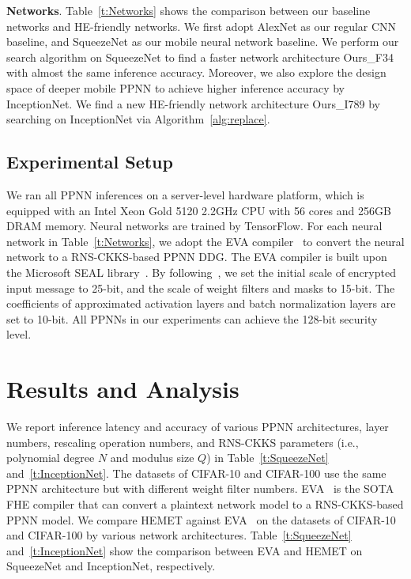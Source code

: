 \documentclass{article}
\begin{document}
\textbf{Networks}. Table~\ref{t:Networks} shows the comparison between our baseline networks and HE-friendly networks. We first adopt AlexNet as our regular CNN baseline, and SqueezeNet as our mobile neural network baseline. We perform our search algorithm on SqueezeNet to find a faster network architecture Ours\_F34 with almost the same inference accuracy. Moreover, we also explore the design space of deeper mobile PPNN to achieve higher inference accuracy by InceptionNet. We find a new HE-friendly network architecture Ours\_I789 by searching on InceptionNet via Algorithm~\ref{alg:replace}.  

	


	
\subsection{Experimental Setup}

We ran all PPNN inferences on a server-level hardware platform, which is equipped with an Intel Xeon Gold 5120 2.2GHz CPU with 56 cores and 256GB DRAM memory. Neural networks are trained by TensorFlow. For each neural network in Table~\ref{t:Networks}, we adopt the EVA compiler~\cite{Dathathri:PLDI20:EVA} to convert the neural network to a RNS-CKKS-based PPNN DDG. The EVA compiler is built upon the Microsoft SEAL library~\cite{sealcrypto}. By following~\cite{Dathathri:PLDI20:EVA}, we set the initial scale of encrypted input message to 25-bit, and the scale of weight filters and masks to 15-bit. The coefficients of approximated activation layers and batch normalization layers are set to 10-bit. All PPNNs in our experiments can achieve the 128-bit security level.
	
	




\section{Results and Analysis}

We report inference latency and accuracy of various PPNN architectures, layer numbers, rescaling operation numbers, and RNS-CKKS parameters (i.e., polynomial degree $N$ and modulus size $Q$) in Table~\ref{t:SqueezeNet} and~\ref{t:InceptionNet}. The datasets of CIFAR-10 and CIFAR-100 use the same PPNN architecture but with different weight filter numbers. EVA~\cite{dathathri:2019PLDI} is the SOTA FHE compiler that can convert a plaintext network model to a RNS-CKKS-based PPNN model. We compare HEMET against EVA~\cite{dathathri:2019PLDI} on the datasets of CIFAR-10 and CIFAR-100 by various network architectures. Table~\ref{t:SqueezeNet} and~\ref{t:InceptionNet} show the comparison between EVA and HEMET on SqueezeNet and InceptionNet, respectively. 
\end{document}
